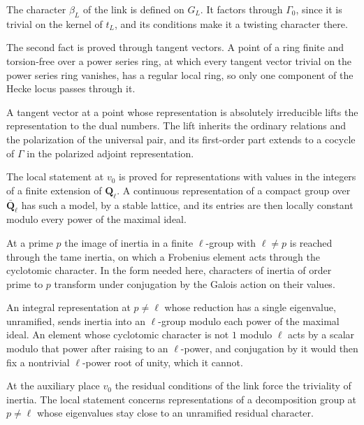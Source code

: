 The character $\beta_L$ of the link is defined on $G_L$. It factors through $\Gamma_0$, since it is trivial on the kernel of $t_L$, and its conditions make it a twisting character there.

The second fact is proved through tangent vectors. A point of a ring finite and torsion-free over a power series ring, at which every tangent vector trivial on the power series ring vanishes, has a regular local ring, so only one component of the Hecke locus passes through it.

A tangent vector at a point whose representation is absolutely irreducible lifts the representation to the dual numbers. The lift inherits the ordinary relations and the polarization of the universal pair, and its first-order part extends to a cocycle of $\Gamma$ in the polarized adjoint representation.

The local statement at $v_0$ is proved for representations with values in the integers of a finite extension of $\mathbf Q_\ell$. A continuous representation of a compact group over $\bar{\mathbf Q}_\ell$ has such a model, by a stable lattice, and its entries are then locally constant modulo every power of the maximal ideal.

At a prime $p$ the image of inertia in a finite $\ell$-group with $\ell\ne p$ is reached through the tame inertia, on which a Frobenius element acts through the cyclotomic character. In the form needed here, characters of inertia of order prime to $p$ transform under conjugation by the Galois action on their values.

An integral representation at $p\ne\ell$ whose reduction has a single eigenvalue, unramified, sends inertia into an $\ell$-group modulo each power of the maximal ideal. An element whose cyclotomic character is not $1$ modulo $\ell$ acts by a scalar modulo that power after raising to an $\ell$-power, and conjugation by it would then fix a nontrivial $\ell$-power root of unity, which it cannot.

At the auxiliary place $v_0$ the residual conditions of the link force the triviality of inertia. The local statement concerns representations of a decomposition group at $p\ne\ell$ whose eigenvalues stay close to an unramified residual character.

